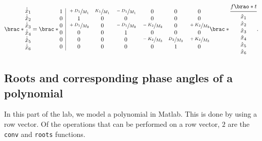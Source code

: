 \documentclass[12pt]{article}
\DeclarePairedDelimiter\brao()%
\DeclarePairedDelimiter\brac[]%
\begin{document}
\begin{equation}
    \brac*{
        \begin{matrix}
            \dot{\hat{x}}_1 \\* \dot{\hat{x}}_2 \\*
            \dot{\hat{x}}_3 \\* \dot{\hat{x}}_4 \\*
            \dot{\hat{x}}_5 \\* \dot{\hat{x}}_6 \\*
        \end{matrix}
    } = \brac*{
        \begin{array}{@{}c|*6c@{}}
            1 & \sfrac{+D_1}{M_1} & \sfrac{K_1}{M_1} & \sfrac{-D_1}{M_1} & 0 & 0 & 0
        \\*
            0 & 1 & 0 & 0 & 0 & 0 & 0
        \\*
            0 & \sfrac{+D_1}{M_2} & 0 & \sfrac{-D_1}{M_2} & \sfrac{-K_2}{M_2} & 0 & \sfrac{+K_2}{M_2}
        \\*
            0 & 0 & 0 & 1 & 0 & 0 & 0
        \\*
            0 & 0 & 0 & 0 & \sfrac{-K_2}{M_3} &  \sfrac{D_2}{M_3} & \sfrac{+K_2}{M_3}
        \\*
            0 & 0 & 0 & 0 & 0 & 1 & 0
        \\*
        \end{array}
    }\brac*{
        \begin{array}{@{}c@{}}
            f\brao*t \\*
            \midrule
            {\hat{x}}_1 \\* {\hat{x}}_2 \\*
            {\hat{x}}_3 \\* {\hat{x}}_4 \\*
            {\hat{x}}_5 \\* {\hat{x}}_6 \\*
        \end{array}
    }.
\end{equation}

\subsection{Roots and corresponding phase angles of a polynomial}

In this part of the lab, we model a polynomial in Matlab.
This is done by using a row vector.
Of the operations that can be performed on a row vector, $2$ are the \texttt{conv} and \texttt{roots} functions.
\end{document}
